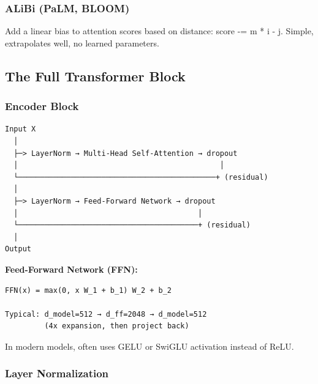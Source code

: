 \documentclass[11pt]{article}
\begin{document}
\subsubsection{ALiBi (PaLM, BLOOM)}\label{alibi-palm-bloom}

Add a linear bias to attention scores based on distance: score -= m * \textbar i - j\textbar. Simple, extrapolates well, no learned parameters.

\subsection{The Full Transformer Block}\label{the-full-transformer-block}


\subsubsection{Encoder Block}\label{encoder-block}

\setcodelang{}

\begin{verbatim}
Input X
  │
  ├─> LayerNorm → Multi-Head Self-Attention → dropout
  │                                              │
  └─────────────────────────────────────────────+ (residual)
  │
  ├─> LayerNorm → Feed-Forward Network → dropout
  │                                         │
  └─────────────────────────────────────────+ (residual)
  │
Output
\end{verbatim}

\textbf{Feed-Forward Network (FFN):}

\setcodelang{}

\begin{verbatim}
FFN(x) = max(0, x W_1 + b_1) W_2 + b_2

Typical: d_model=512 → d_ff=2048 → d_model=512
         (4x expansion, then project back)
\end{verbatim}

In modern models, often uses GELU or SwiGLU activation instead of ReLU.

\subsubsection{Layer Normalization}\label{layer-normalization}
\end{document}
